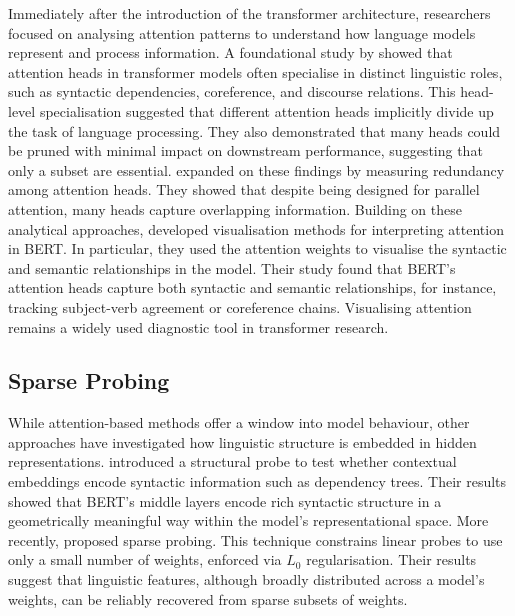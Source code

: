 Immediately after the introduction of the transformer architecture, researchers focused on analysing attention patterns to understand how language models represent and process information. A foundational study by \citet{voita2019analyzing} showed that attention heads in transformer models often specialise in distinct linguistic roles, such as syntactic dependencies, coreference, and discourse relations. This head-level specialisation suggested that different attention heads implicitly divide up the task of language processing. They also demonstrated that many heads could be pruned with minimal impact on downstream performance, suggesting that only a subset are essential. \citet{michel2019sixteen} expanded on these findings by measuring redundancy among attention heads. They showed that despite being designed for parallel attention, many heads capture overlapping information. Building on these analytical approaches, \citet{clark2019does} developed visualisation methods for interpreting attention in BERT. In particular, they used the attention weights to visualise the syntactic and semantic relationships in the model. Their study found that BERT's attention heads capture both syntactic and semantic relationships, for instance, tracking subject-verb agreement or coreference chains. Visualising attention remains a widely used diagnostic tool in transformer research. 

\subsection{Sparse Probing}

While attention-based methods offer a window into model behaviour, other approaches have investigated how linguistic structure is embedded in hidden representations. \citet{hewitt2019structural} introduced a structural probe to test whether contextual embeddings encode syntactic information such as dependency trees. Their results showed that BERT's middle layers encode rich syntactic structure in a geometrically meaningful way within the model's representational space. More recently, \citet{gurnee2023finding} proposed sparse probing. This technique constrains linear probes to use only a small number of weights, enforced via $L_0$ regularisation. Their results suggest that linguistic features, although broadly distributed across a model's weights, can be reliably recovered from sparse subsets of weights. %


